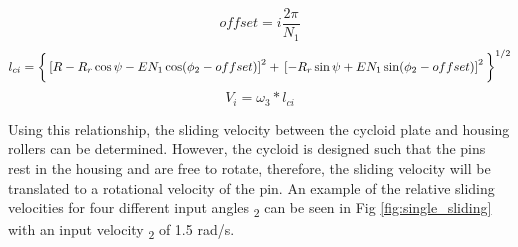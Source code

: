 \begin{equation} \label{eq:single_slide_offset}
offset = i \frac{2\pi}{N_1}
\end{equation}
\begin{dmath} \label{eq:single_slide_length}
l_{ci} = \bigg\{\left[R-R_r\cos\psi - E N_1 \cos(\phi_2 - offset)\right]^2 
+\\ \left[-R_r \sin{\psi} + E N_1 \sin(\phi_2 - offset)\right]^2 \bigg\}^{1/2}
\end{dmath}
\begin{equation} \label{eq:single_slide_vel}
V_i = \omega_3 * l_{ci}
\end{equation}

Using this relationship, the sliding velocity between the cycloid plate and housing rollers can be determined. However, the cycloid is designed such that the pins rest in the housing and are free to rotate, therefore, the sliding velocity will be translated to a rotational velocity of the pin. An example of the relative sliding velocities for four different input angles \textphi\textsubscript{2} can be seen in Fig \ref{fig:single_sliding} with an input velocity \textomega\textsubscript{2} of 1.5 rad/s.

